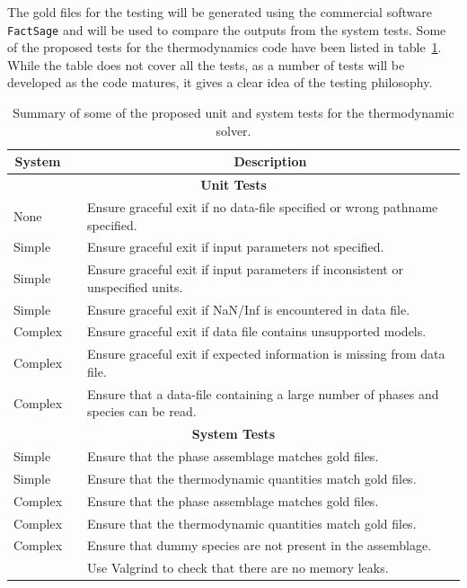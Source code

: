 	The gold files for the testing will be generated using the commercial software \texttt{FactSage} and will be used to compare the outputs from the system tests. Some of the proposed tests for the thermodynamics code have been listed in table~\ref{tab:tests}. While the table does not cover all the tests, as a number of tests will be developed as the code matures, it gives a clear idea of the testing philosophy.
	\begin{table}[htp]
		\caption{Summary of some of the proposed unit and system tests for the thermodynamic solver.}
		\centering
		\begin{tabular}{@{}l c p{}@{}}
		\toprule
		\multicolumn{1}{c}{\textbf{System}} &\phantom{abc}& \multicolumn{1}{c}{\textbf{Description}}\\
		\midrule
		\multicolumn{3}{c}{\textbf{Unit Tests}}\\
		\midrule
		None && Ensure graceful exit if no data-file specified or wrong pathname specified. \\
		Simple && Ensure graceful exit if input parameters not specified. \\
		Simple && Ensure graceful exit if input parameters if inconsistent or unspecified units. \\
		Simple && Ensure graceful exit if NaN/Inf is encountered in data file. \\
		Complex && Ensure graceful exit if data file contains unsupported models. \\
		Complex && Ensure graceful exit if expected information is missing from data file. \\
		Complex && Ensure that a data-file containing a large number of phases and species can be read. \\
		\midrule
		\multicolumn{3}{c}{\textbf{System Tests}}\\
		\midrule
		Simple && Ensure that the phase assemblage matches gold files. \\
		Simple && Ensure that the thermodynamic quantities match gold files. \\
		Complex && Ensure that the phase assemblage matches gold files. \\
		Complex && Ensure that the thermodynamic quantities match gold files. \\
		Complex && Ensure that dummy species are not present in the assemblage. \\
		{} && Use Valgrind to check that there are no memory leaks. \\
		\bottomrule
		\end{tabular}
		\label{tab:tests}
	\end{table}%

